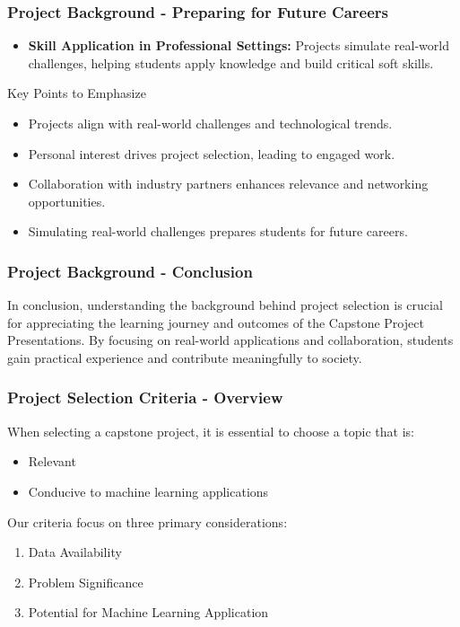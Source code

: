 \documentclass[aspectratio=169]{beamer}
\begin{document}
\begin{frame}[fragile]
  \frametitle{Project Background - Preparing for Future Careers}
  \begin{itemize}
    \item \textbf{Skill Application in Professional Settings:} 
    Projects simulate real-world challenges, helping students apply knowledge and build critical soft skills.
  \end{itemize}
  \begin{block}{Key Points to Emphasize}
    \begin{itemize}
      \item Projects align with real-world challenges and technological trends.
      \item Personal interest drives project selection, leading to engaged work.
      \item Collaboration with industry partners enhances relevance and networking opportunities.
      \item Simulating real-world challenges prepares students for future careers.
    \end{itemize}
  \end{block}
\end{frame}

\begin{frame}[fragile]
  \frametitle{Project Background - Conclusion}
  In conclusion, understanding the background behind project selection is crucial for appreciating the learning journey and outcomes of the Capstone Project Presentations. By focusing on real-world applications and collaboration, students gain practical experience and contribute meaningfully to society.
\end{frame}

\begin{frame}[fragile]
  \frametitle{Project Selection Criteria - Overview}
  When selecting a capstone project, it is essential to choose a topic that is:
  \begin{itemize}
    \item Relevant
    \item Conducive to machine learning applications
  \end{itemize}

  Our criteria focus on three primary considerations:
  \begin{enumerate}
    \item Data Availability
    \item Problem Significance
    \item Potential for Machine Learning Application
  \end{enumerate}
\end{frame}
\end{document}
